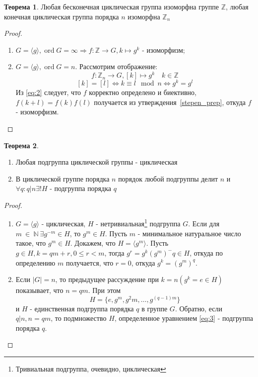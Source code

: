 \documentclass[11pt,a4paper]{report}
\def\Integer{\mathbb{Z}}
\def\Natural{\mathbb{N}}
\DeclareMathOperator{\ord}{ord}
\renewcommand{\leq}{\leqslant}
\renewcommand{\implies}{\Rightarrow}
\newcommand{\is}{\Leftrightarrow}
\theoremstyle{definition}
\theoremstyle{definition}
\newtheorem{theorem}{Теорема}[section]
\theoremstyle{definition}
\begin{document}
	\begin{theorem}\label{cyclic_group_theorem}
	Любая бесконечная циклическая группа изоморфна группе $\Integer$, любая конечная циклическая группа порядка $n$ изоморфна $\Integer_n$
	\begin{proof}
	\begin{enumerate}
	\item{$G=\langle g\rangle, \ord{G} = \infty\implies f:\Integer\rightarrow G, k\mapsto g^k$ - изоморфизм;}
	\item{$G=\langle g \rangle, \ord{G} = n.$ Рассмотрим отображение:
	\begin{equation}
	f:\Integer_n\rightarrow G, [k]\mapsto g^k\quad k\in \Integer
	\end{equation}}
	\begin{equation}\label{eq:2}
	[k] = [l]\is k\equiv l \mod{n}\is g^k=g^l
	\end{equation}
	Из \ref{eq:2} следует, что $f$ корректно определено и биективно, $f(k+l)=f(k)f(l)$ получается из утверждения~\ref{stepen_prep}, откуда $f$ - изоморфизм.
	\end{enumerate}
	\end{proof}
	\end{theorem}
	
	
	
	\begin{theorem}\label{subgroup_cyclic_theorem}
	\begin{enumerate}
	\item{Любая подгруппа циклической группы - циклическая}
	\item{В циклической группе порядка $n$ порядок любой подгруппы делит $n$ и $\forall q: q | n \exists ! H$ - подгруппа порядка $q$}
	\end{enumerate}
	\begin{proof}
	\begin{enumerate}
	\item{
	$G=\langle g\rangle$ - циклическая, $H$ - нетривиальная\footnote{Тривиальная подгруппа, очевидно, циклическая} подгруппа $G$. Если для $m~\in~\Natural~\exists g^{-m}\in H$, то $g^m\in H$. Пусть $m$ - минимальное натуральное число такое, что $g^m\in H$. Докажем, что $H = \langle g^m\rangle$. Пусть $g\in H, k = qm+r, 0\leq r<m$, тогда $g^r=g^k(g^m)^-q\in H$, откуда по определению $m$ получается, что $r=0$, откуда $g^k=(g^m)^q$.}
	\item{
	Если $|G|=n$, то предыдущее рассуждение при $k = n (g^k=e\in H)$ показывает, что $n=qm$. При этом \begin{equation}\label{eq:3}H = \{e, g^m, g^2m, \ldots, g^{(q-1)m}\}\end{equation} и $H$ - единственная подгруппа порядка $q$ в группе $G$. Обратно, если $q |n, n = qm$, то подмножество $H$, определенное уравнением \eqref{eq:3} - подгруппа порядка $q$.}
	\end{enumerate}
	\end{proof}
	\end{theorem}
	
\end{document}

